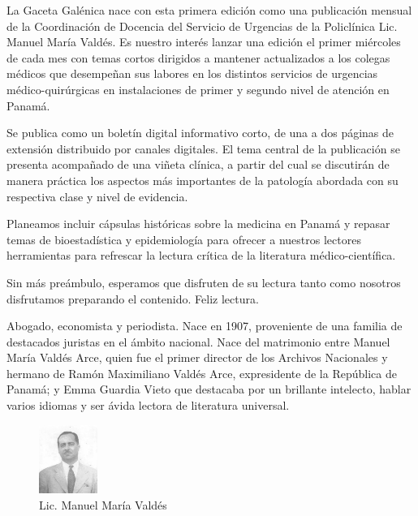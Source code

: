 \documentclass[a4paper]{article}
\date{\today}
\let\cite=\supercite
\begin{document}
\maketitle

\begin{multicols}{3}



La Gaceta Galénica nace con esta primera edición como una publicación mensual de
la Coordinación de Docencia del Servicio de Urgencias de la Policlínica Lic.
Manuel María Valdés. Es nuestro interés lanzar una edición el primer miércoles
de cada mes con temas cortos dirigidos a mantener actualizados a los colegas
médicos que desempeñan sus labores en los distintos servicios de urgencias
médico-quirúrgicas en instalaciones de primer y segundo nivel de atención en
Panamá.

Se publica como un boletín digital informativo corto, de una a dos páginas de
extensión distribuido por canales digitales. El tema central de la publicación
se presenta acompañado de una viñeta clínica, a partir del cual se discutirán
de manera práctica los aspectos más importantes de la patología abordada con su
respectiva clase y nivel de evidencia.

Planeamos incluir cápsulas históricas sobre la medicina en Panamá y repasar
temas de bioestadística y epidemiología para ofrecer a nuestros lectores
herramientas para refrescar la lectura crítica de la literatura
médico-científica.

Sin más preámbulo, esperamos que disfruten de su lectura tanto como nosotros
disfrutamos preparando el contenido. Feliz lectura.

\closearticle



Abogado, economista y periodista. Nace en 1907, proveniente de una familia de
destacados juristas en el ámbito nacional. Nace del matrimonio entre Manuel
María Valdés Arce, quien fue el primer director de los Archivos Nacionales y
hermano de Ramón Maximiliano Valdés Arce, expresidente de la República de
Panamá; y Emma Guardia Vieto que destacaba por un brillante intelecto, hablar
varios idiomas y ser ávida lectora de literatura universal\cite{panamerica10}.

\begin{figure}
	\begin{center}
		\vspace{-10pt}
		\includegraphics[width=0.17\textwidth]{mmvaldes.jpg}
	\end{center}
	\caption*{Lic. Manuel María Valdés}
\end{figure}


\end{multicols}
\end{document}
